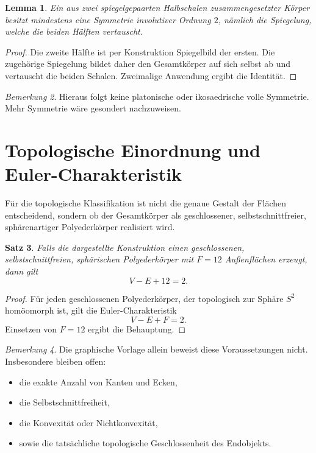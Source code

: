 \documentclass[11pt]{article}
\theoremstyle{plain}
\newtheorem{satz}{Satz}
\newtheorem{lemma}[satz]{Lemma}
\theoremstyle{definition}
\theoremstyle{remark}
\newtheorem{bemerkung}[satz]{Bemerkung}
\begin{document}
	\begin{lemma}
		Ein aus zwei spiegelgepaarten Halbschalen zusammengesetzter Körper besitzt mindestens eine Symmetrie involutiver Ordnung \(2\), nämlich die Spiegelung, welche die beiden Hälften vertauscht.
	\end{lemma}
	
	\begin{proof}
		Die zweite Hälfte ist per Konstruktion Spiegelbild der ersten. Die zugehörige Spiegelung bildet daher den Gesamtkörper auf sich selbst ab und vertauscht die beiden Schalen. Zweimalige Anwendung ergibt die Identität.
	\end{proof}
	
	\begin{bemerkung}
		Hieraus folgt keine platonische oder ikosaedrische volle Symmetrie. Mehr Symmetrie wäre gesondert nachzuweisen.
	\end{bemerkung}
	
	\section{Topologische Einordnung und Euler-Charakteristik}
	
	Für die topologische Klassifikation ist nicht die genaue Gestalt der Flächen entscheidend, sondern ob der Gesamtkörper als geschlossener, selbstschnittfreier, sphärenartiger Polyederkörper realisiert wird.
	
	\begin{satz}
		Falls die dargestellte Konstruktion einen geschlossenen, selbstschnittfreien, sphärischen Polyederkörper mit \(F=12\) Außenflächen erzeugt, dann gilt
		\[
		V-E+12=2.
		\]
	\end{satz}
	
	\begin{proof}
		Für jeden geschlossenen Polyederkörper, der topologisch zur Sphäre \(S^2\) homöomorph ist, gilt die Euler-Charakteristik
		\[
		V-E+F=2.
		\]
		Einsetzen von \(F=12\) ergibt die Behauptung.
	\end{proof}
	
	\begin{bemerkung}
		Die graphische Vorlage allein beweist diese Voraussetzungen nicht. Insbesondere bleiben offen:
		\begin{itemize}
			\item die exakte Anzahl von Kanten und Ecken,
			\item die Selbstschnittfreiheit,
			\item die Konvexität oder Nichtkonvexität,
			\item sowie die tatsächliche topologische Geschlossenheit des Endobjekts.
		\end{itemize}
	\end{bemerkung}
	
\end{document}
